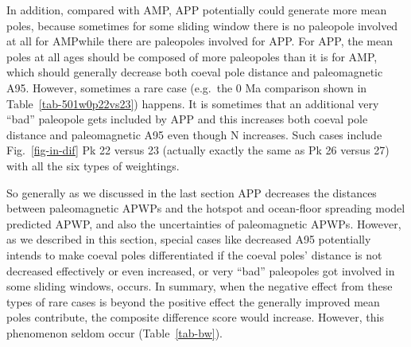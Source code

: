 In addition, compared with AMP, APP potentially could generate more mean poles,
because sometimes for some sliding window there is no paleopole involved at all
for AMP\@ while there are paleopoles involved for APP\@. For APP, the mean poles
at all ages should be composed of more paleopoles than it is for AMP, which
should generally decrease both coeval pole distance and paleomagnetic A95.
However, sometimes a rare case (e.g.\ the 0 Ma comparison shown in
Table~\ref{tab-501w0p22vs23}) happens. It is sometimes that an additional very
``bad'' paleopole gets included by APP and this increases both coeval pole
distance and paleomagnetic A95 even though N increases. Such cases include
Fig.~\ref{fig-in-dif} Pk 22 versus 23 (actually exactly the same as Pk 26 versus
27) with all the six types of weightings.

So generally as we discussed in the last section APP decreases the distances
between paleomagnetic APWPs and the hotspot and ocean-floor spreading model
predicted APWP, and also the uncertainties of paleomagnetic APWPs. However, as
we described in this section, special cases like decreased A95 potentially
intends to make coeval poles differentiated if the coeval poles' distance is
not decreased effectively or even increased, or very ``bad'' paleopoles got
involved in some sliding windows, occurs. In summary, when the negative effect
from these types of rare cases is beyond the positive effect the generally
improved mean poles contribute, the composite difference score would increase.
However, this phenomenon seldom occur (Table~\ref{tab-bw}).

